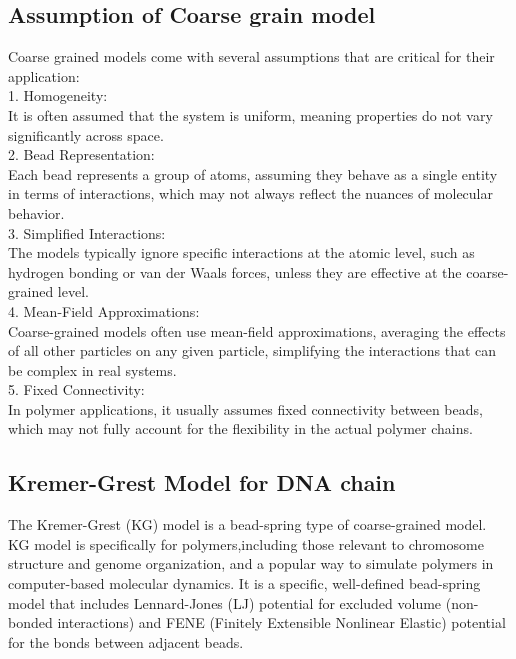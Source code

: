 \documentclass[12pt]{article}
\begin{document}
\begin{flushleft}
	
\subsection*{Assumption of Coarse grain model}
Coarse grained models come with several assumptions that are critical for their application:\\
    1. Homogeneity:\\
    It is often assumed that the system is uniform, meaning properties do not vary significantly across space. \\
    2. Bead Representation:\\
        Each bead represents a group of atoms, assuming they behave as a single entity in terms of interactions, which may not always reflect the nuances of molecular behavior. \\
    3. Simplified Interactions:\\
        The models typically ignore specific interactions at the atomic level, such as hydrogen bonding or van der Waals forces, unless they are effective at the coarse-grained level. \\
    4. Mean-Field Approximations:\\
        Coarse-grained models often use mean-field approximations, averaging the effects of all other particles on any given particle, simplifying the interactions that can be complex in real systems. \\
    5. Fixed Connectivity:\\
        In polymer applications, it usually assumes fixed connectivity between beads, which may not fully account for the flexibility in the actual polymer chains. \\ 
	
	
	
	
	
	
\subsection*{Kremer-Grest Model for DNA chain}

	
The Kremer-Grest (KG) model is a bead-spring type of coarse-grained model. KG model is specifically for polymers,including those relevant to chromosome structure and genome organization, and a popular way to simulate polymers in computer-based molecular dynamics. It is a specific, well-defined bead-spring model that includes Lennard-Jones (LJ) potential for excluded volume (non-bonded interactions) and FENE (Finitely Extensible Nonlinear Elastic) potential for the bonds between adjacent beads.	



\end{flushleft}
\end{document}
